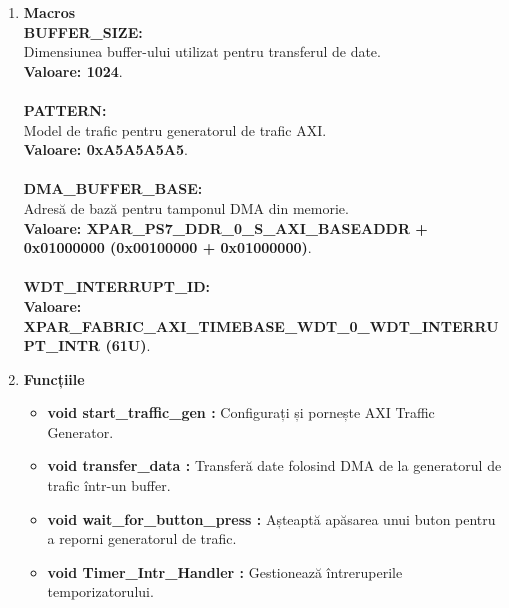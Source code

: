 \documentclass[12pt]{article}
\begin{document}
\begin{enumerate}
    \item \textbf{Macros}\\
    \hspace*{1cm} \textbf{BUFFER\_SIZE:} \\
    \hspace*{1cm} Dimensiunea buffer-ului utilizat pentru transferul de date.\\
    \hspace*{1cm} \textbf{Valoare: 1024}.\\\\
    \hspace*{1cm} \textbf{PATTERN:} \\
    \hspace*{1cm} Model de trafic pentru generatorul de trafic AXI.\\
    \hspace*{1cm} \textbf{Valoare: 0xA5A5A5A5}.\\\\
    \hspace*{1cm} \textbf{DMA\_BUFFER\_BASE:} \\
    \hspace*{1cm} Adresă de bază pentru tamponul DMA din memorie.\\
    \hspace*{1cm} \textbf{Valoare: XPAR\_PS7\_DDR\_0\_S\_AXI\_BASEADDR + 0x01000000 (0x00100000 + 0x01000000)}.\\\\
    \hspace*{1cm} \textbf{WDT\_INTERRUPT\_ID:} \\
    \hspace*{1cm} \textbf{Valoare: XPAR\_FABRIC\_AXI\_TIMEBASE\_WDT\_0\_WDT\_INTERRUPT\_INTR (61U)}.\\
    \item \textbf{Funcțiile}
        \begin{itemize}
            \item \textbf{void start\_traffic\_gen :} Configurați și pornește AXI Traffic Generator.
            \item \textbf{void transfer\_data :} Transferă date folosind DMA de la generatorul de trafic într-un buffer.
            \item \textbf{void wait\_for\_button\_press :} Așteaptă apăsarea unui buton pentru a reporni generatorul de trafic.
            \item \textbf{void Timer\_Intr\_Handler :} Gestionează întreruperile temporizatorului.

\end{itemize}
\end{enumerate}
\end{document}

